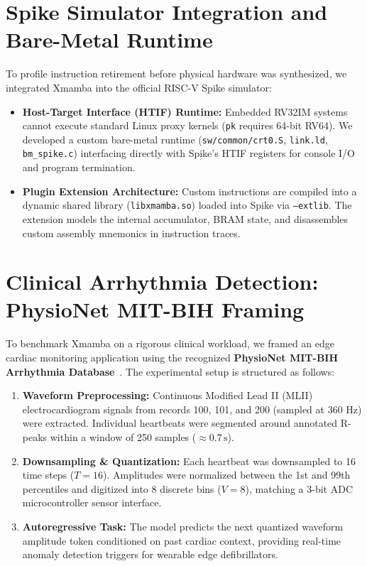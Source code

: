 \documentclass[11pt,a4paper,oneside]{report}
\begin{document}
\section{Spike Simulator Integration and Bare-Metal Runtime}
To profile instruction retirement before physical hardware was synthesized, we integrated Xmamba into the official RISC-V Spike simulator:
\begin{itemize}
    \item \textbf{Host-Target Interface (HTIF) Runtime:} Embedded RV32IM systems cannot execute standard Linux proxy kernels (\texttt{pk} requires 64-bit RV64). We developed a custom bare-metal runtime (\texttt{sw/common/crt0.S}, \texttt{link.ld}, \texttt{bm\_spike.c}) interfacing directly with Spike's HTIF registers for console I/O and program termination.
    \item \textbf{Plugin Extension Architecture:} Custom instructions are compiled into a dynamic shared library (\texttt{libxmamba.so}) loaded into Spike via \texttt{--extlib}. The extension models the internal accumulator, BRAM state, and disassembles custom assembly mnemonics in instruction traces.
\end{itemize}

\section{Clinical Arrhythmia Detection: PhysioNet MIT-BIH Framing}
To benchmark Xmamba on a rigorous clinical workload, we framed an edge cardiac monitoring application using the recognized \textbf{PhysioNet MIT-BIH Arrhythmia Database}~\cite{goldberger2000physiobank, moodie1983mitbih}. The experimental setup is structured as follows:
\begin{enumerate}
    \item \textbf{Waveform Preprocessing:} Continuous Modified Lead II (MLII) electrocardiogram signals from records 100, 101, and 200 (sampled at 360 Hz) were extracted. Individual heartbeats were segmented around annotated R-peaks within a window of 250 samples ($\approx 0.7\,\text{s}$).
    \item \textbf{Downsampling \& Quantization:} Each heartbeat was downsampled to 16 time steps ($T=16$). Amplitudes were normalized between the 1st and 99th percentiles and digitized into 8 discrete bins ($V=8$), matching a 3-bit ADC microcontroller sensor interface.
    \item \textbf{Autoregressive Task:} The model predicts the next quantized waveform amplitude token conditioned on past cardiac context, providing real-time anomaly detection triggers for wearable edge defibrillators.
\end{enumerate}
\end{document}
